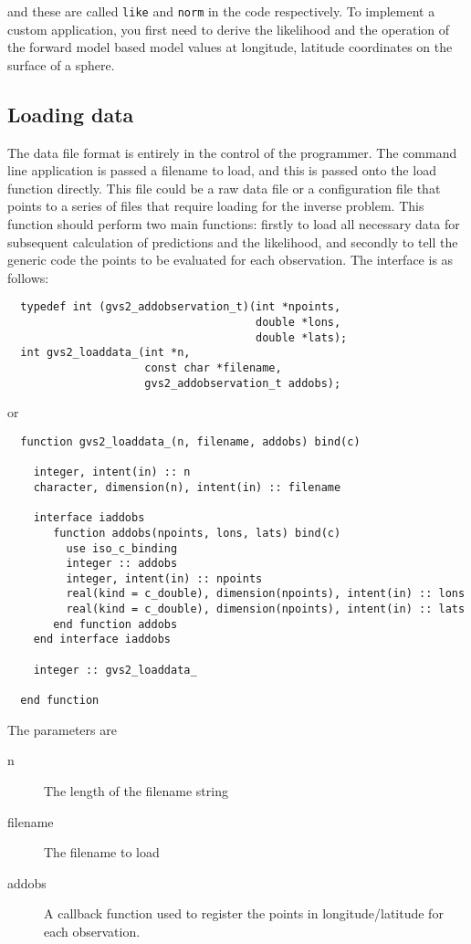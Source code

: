 \documentclass{article}
\begin{document}
and these are called {\tt like} and {\tt norm} in the code
respectively. To implement a custom application, you first need to
derive the likelihood and the operation of the forward model based
model values at longitude, latitude coordinates on the surface of a
sphere.

\subsection{Loading data}

The data file format is entirely in the control of the programmer. The command line
application is passed a filename to load, and this is passed onto the load function
directly. This file could be a raw data file or a configuration file that points
to a series of files that require loading for the inverse problem. This function
should perform two main functions: firstly to load all necessary data for subsequent
calculation of predictions and the likelihood, and secondly to tell the generic
code the points to be evaluated for each observation. The interface is as follows:

\begin{verbatim}
  typedef int (gvs2_addobservation_t)(int *npoints,
                                      double *lons,
                                      double *lats);
  int gvs2_loaddata_(int *n,
                     const char *filename,
                     gvs2_addobservation_t addobs);
\end{verbatim}

or

\begin{verbatim}
  function gvs2_loaddata_(n, filename, addobs) bind(c)

    integer, intent(in) :: n
    character, dimension(n), intent(in) :: filename

    interface iaddobs
       function addobs(npoints, lons, lats) bind(c)
         use iso_c_binding
         integer :: addobs
         integer, intent(in) :: npoints
         real(kind = c_double), dimension(npoints), intent(in) :: lons
         real(kind = c_double), dimension(npoints), intent(in) :: lats
       end function addobs
    end interface iaddobs
   
    integer :: gvs2_loaddata_

  end function
\end{verbatim}

The parameters are

\begin{description}
\item[n] The length of the filename string
\item[filename] The filename to load
\item[addobs] A callback function used to register the points in longitude/latitude for each
  observation.
\end{description}
\end{document}
